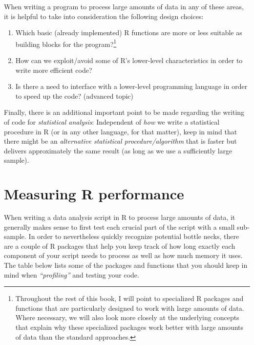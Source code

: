 \documentclass[
  12pt,
]{style/krantz}
\providecommand{\tightlist}{%
  \setlength{\itemsep}{0pt}\setlength{\parskip}{0pt}}
\begin{document}
When writing a program to process large amounts of data in any of these areas, it is helpful to take into consideration the following design choices:

\begin{enumerate}
\def\labelenumi{\arabic{enumi}.}
\tightlist
\item
  Which basic (already implemented) R functions are more or less suitable as building blocks for the program?\footnote{Throughout the rest of this book, I will point to specialized R packages and functions that are particularly designed to work with large amounts of data. Where necessary, we will also look more closely at the underlying concepts that explain why these specialized packages work better with large amounts of data than the standard approaches.}
\item
  How can we exploit/avoid some of R's lower-level characteristics in order to write more efficient code?
\item
  Is there a need to interface with a lower-level programming language in order to speed up the code? (advanced topic)
\end{enumerate}

Finally, there is an additional important point to be made regarding the writing of code for \emph{statistical analysis}: Independent of \emph{how} we write a statistical procedure in R (or in any other language, for that matter), keep in mind that there might be an \emph{alternative statistical procedure/algorithm} that is faster but delivers approximately the same result (as long as we use a sufficiently large sample).

\hypertarget{measuring-r-performance}{%
\section{Measuring R performance}\label{measuring-r-performance}}

When writing a data analysis script in R to process large amounts of data, it generally makes sense to first test each crucial part of the script with a small sub-sample. In order to nevertheless quickly recognize potential bottle necks, there are a couple of R packages that help you keep track of how long exactly each component of your script needs to process as well as how much memory it uses. The table below lists some of the packages and functions that you should keep in mind when \emph{``profiling''} and testing your code.
\end{document}
